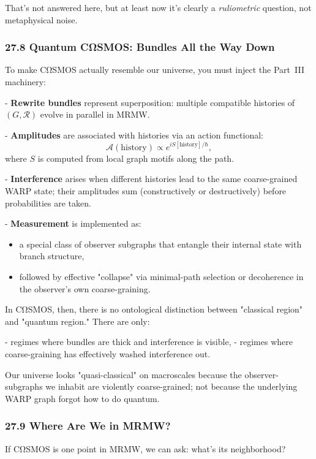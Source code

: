 That’s not answered here, but at least now it’s clearly a \emph{ruliometric} question, not metaphysical noise.

\subsubsection*{27.8  Quantum CΩSMOS: Bundles All the Way Down}

To make CΩSMOS actually resemble our universe, you must inject the Part~III machinery:

- \textbf{Rewrite bundles} represent superposition: multiple compatible histories of $(G,\mathcal{R})$ evolve in parallel in MRMW.

- \textbf{Amplitudes} are associated with histories via an action functional:
  \[
    \mathcal{A}(\text{history}) \propto e^{i S[\text{history}]/\hbar},
  \]
  where $S$ is computed from local graph motifs along the path.

- \textbf{Interference} arises when different histories lead to the same coarse-grained WARP state; their amplitudes sum (constructively or destructively) before probabilities are taken.

- \textbf{Measurement} is implemented as:
  \begin{itemize}
    \item a special class of observer subgraphs that entangle their internal state with branch structure,
    \item followed by effective "collapse" via minimal-path selection or decoherence in the observer’s own coarse-graining.
  \end{itemize}

In CΩSMOS, then, there is no ontological distinction between "classical region" and "quantum region." There are only:

- regimes where bundles are thick and interference is visible,
- regimes where coarse-graining has effectively washed interference out.

Our universe looks "quasi-classical" on macroscales because the observer-subgraphs we inhabit are violently coarse-grained; not because the underlying WARP graph forgot how to do quantum.

\subsubsection*{27.9  Where Are We in MRMW?}

If CΩSMOS is one point in MRMW, we can ask: what’s its neighborhood?

